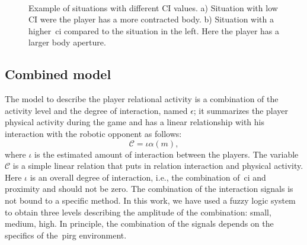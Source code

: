 \begin{figure}[h]
    \centering 
	\begin{subfigure}[h]{0.48\textwidth}
		\centering      
		\caption{}
	\end{subfigure}
	~
	\begin{subfigure}[h]{0.48\textwidth}
		\centering      
      	\caption{}
     \end{subfigure}
      \caption{Example of situations with different CI values. a) Situation with low CI were the player has a more contracted body. b) Situation with a higher~\gls{ci} compared to the situation in the left. Here the player has a larger body aperture.}
      \label{fig:low_high_CI}
\end{figure}

\subsection{Combined model}\label{sec:engagement}
The model to describe the player relational activity is a combination of the activity level and the degree of interaction, named $\epsilon$; it summarizes the player physical activity during the game and has a linear relationship with his interaction with the robotic opponent as follows: 
\begin{equation}
\label{enagementeq}
\mathcal{C}=\iota \alpha(m),
\end{equation}
where $\iota$ is the estimated amount of interaction between the players. 
The variable $\mathcal{C}$ is a simple linear relation that puts in relation interaction and physical activity. Here $\iota$ is an overall degree of interaction, i.e., the combination of~\gls{ci} and proximity and should not be zero. The combination of the interaction signals is not bound to a specific method. In this work, we have used a fuzzy logic system to obtain three levels describing the amplitude of the combination: small, medium, high. %
In principle, the combination of the signals depends on the specifics of the~\gls{pirg} environment. 

